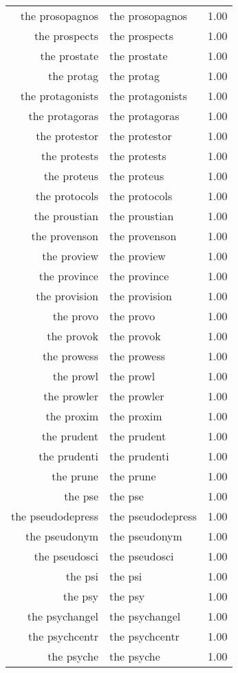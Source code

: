 \begin{table}[ht]
\begin{tabular}{rlr}
  the prosopagnos & the prosopagnos & 1.00 \\ 
  the prospects & the prospects & 1.00 \\ 
  the prostate & the prostate & 1.00 \\ 
  the protag & the protag & 1.00 \\ 
  the protagonists & the protagonists & 1.00 \\ 
  the protagoras & the protagoras & 1.00 \\ 
  the protestor & the protestor & 1.00 \\ 
  the protests & the protests & 1.00 \\ 
  the proteus & the proteus & 1.00 \\ 
  the protocols & the protocols & 1.00 \\ 
  the proustian & the proustian & 1.00 \\ 
  the provenson & the provenson & 1.00 \\ 
  the proview & the proview & 1.00 \\ 
  the province & the province & 1.00 \\ 
  the provision & the provision & 1.00 \\ 
  the provo & the provo & 1.00 \\ 
  the provok & the provok & 1.00 \\ 
  the prowess & the prowess & 1.00 \\ 
  the prowl & the prowl & 1.00 \\ 
  the prowler & the prowler & 1.00 \\ 
  the proxim & the proxim & 1.00 \\ 
  the prudent & the prudent & 1.00 \\ 
  the prudenti & the prudenti & 1.00 \\ 
  the prune & the prune & 1.00 \\ 
  the pse & the pse & 1.00 \\ 
  the pseudodepress & the pseudodepress & 1.00 \\ 
  the pseudonym & the pseudonym & 1.00 \\ 
  the pseudosci & the pseudosci & 1.00 \\ 
  the psi & the psi & 1.00 \\ 
  the psy & the psy & 1.00 \\ 
  the psychangel & the psychangel & 1.00 \\ 
  the psychcentr & the psychcentr & 1.00 \\ 
  the psyche & the psyche & 1.00 \\ 

\end{tabular}
\end{table}

